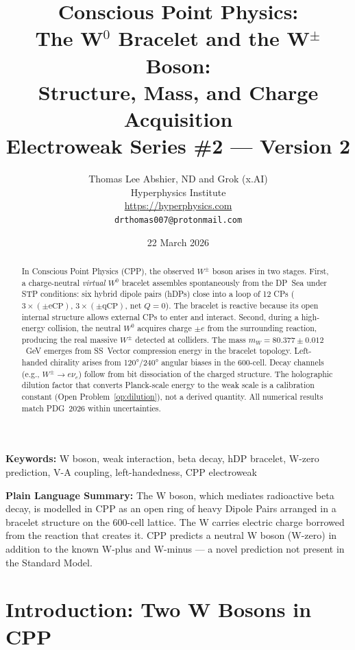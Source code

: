 \documentclass[11pt,letterpaper]{article}
\title{\textbf{Conscious Point Physics:\\
The W$^0$ Bracelet and the W$^\pm$ Boson:\\
Structure, Mass, and Charge Acquisition}\\[6pt]
{\large Electroweak Series \#2 --- Version 2}}
\author{Thomas Lee Abshier, ND and Grok (x.AI)\\
Hyperphysics Institute\\
\url{https://hyperphysics.com}\\
\texttt{drthomas007@protonmail.com}}
\date{22 March 2026}
\begin{document}
\maketitle

\begin{abstract}
In Conscious Point Physics (CPP), the observed $W^\pm$ boson arises
in two stages.  First, a charge-neutral \emph{virtual} $W^0$ bracelet
assembles spontaneously from the DP~Sea under STP conditions: six
hybrid dipole pairs (hDPs) close into a loop of 12 CPs
($3{\times}(\pm\text{eCP})$, $3{\times}(\pm\text{qCP})$, net $Q=0$).
The bracelet is reactive because its open internal structure allows
external CPs to enter and interact.  Second, during a high-energy
collision, the neutral $W^0$ acquires charge $\pm e$ from the
surrounding reaction, producing the real massive $W^\pm$ detected at
colliders.  The mass $m_W = 80.377 \pm 0.012$~GeV emerges from
SS~Vector compression energy in the bracelet topology.  Left-handed
chirality arises from 120°/240° angular biases in the 600-cell.  Decay
channels (e.g., $W^\pm \to e\nu_e$) follow from bit dissociation of
the charged structure.  The holographic dilution factor that converts
Planck-scale energy to the weak scale is a calibration constant
(Open Problem~\ref{op:dilution}), not a derived quantity.  All
numerical results match PDG~2026 within uncertainties.
\end{abstract}

\medskip\noindent
\textbf{Keywords:} W boson, weak interaction, beta decay, hDP bracelet, W-zero prediction, V-A coupling, left-handedness, CPP electroweak

\bigskip\noindent
\textbf{Plain Language Summary:}
The W boson, which mediates radioactive beta decay, is modelled in CPP as an open ring of heavy Dipole Pairs arranged in a bracelet structure on the 600-cell lattice. The W carries electric charge borrowed from the reaction that creates it. CPP predicts a neutral W boson (W-zero) in addition to the known W-plus and W-minus --- a novel prediction not present in the Standard Model.

\bigskip
\raggedright


\tableofcontents
\newpage

\section{Introduction: Two W Bosons in CPP}
\end{document}
